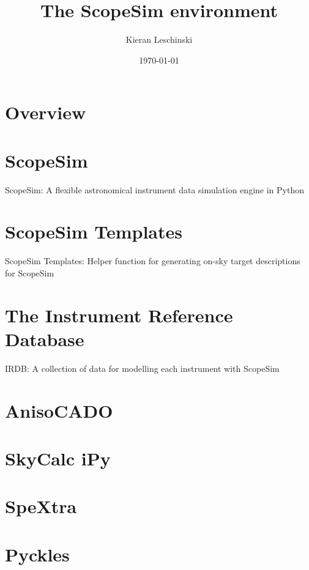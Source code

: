 \documentclass[a4paper,twoside,11pt]{report}
\title{The ScopeSim environment}
\author{Kieran Leschinski}
\date{\today}
\begin{document}
\maketitle


\chapter{Overview}


\chapter{ScopeSim}{ScopeSim: A flexible astronomical instrument data simulation engine in Python}


\chapter{ScopeSim Templates}{ScopeSim Templates: Helper function for generating on-sky target descriptions for ScopeSim}


\chapter{The Instrument Reference Database}{IRDB: A collection of data for modelling each instrument with ScopeSim}


\chapter{AnisoCADO}


\chapter{SkyCalc iPy}


\chapter{SpeXtra}


\chapter{Pyckles}

\end{document}
